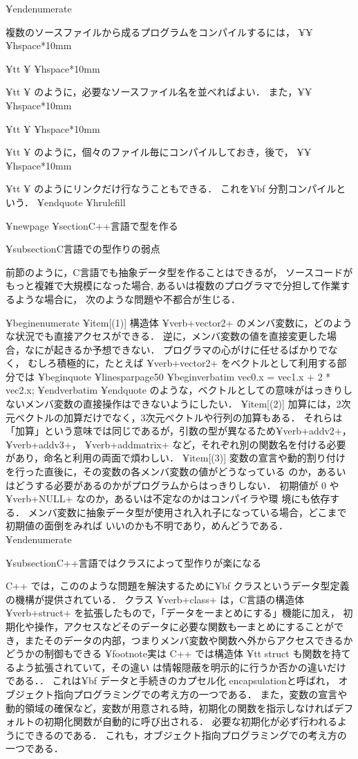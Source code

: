 ¥end{enumerate}

複数のソースファイルから成るプログラムをコンパイルするには，	¥¥
¥hspace*{10mm}{¥tt ¥%
¥hspace*{10mm}{¥tt ¥%
のように，必要なソースファイル名を並べればよい．
また，¥¥
¥hspace*{10mm}{¥tt ¥%
¥hspace*{10mm}{¥tt ¥%
のように，個々のファイル毎にコンパイルしておき，後で，	¥¥
¥hspace*{10mm}{¥tt ¥%
のようにリンクだけ行なうこともできる．
これを{¥bf 分割コンパイル}という．
¥end{quote}
¥hrulefill

¥newpage
¥section{C++言語で型を作る}

¥subsection{C言語での型作りの弱点}

前節のように，C言語でも抽象データ型を作ることはできるが，
ソースコードがもっと複雑で大規模になった場合,
あるいは複数のプログラマで分担して作業するような場合に，
次のような問題や不都合が生じる．

¥begin{enumerate}
 ¥item[(1)] 
構造体 ¥verb+vector2+ のメンバ変数に，どのような状況でも直接アクセスができる．
逆に，メンバ変数の値を直接変更した場合，なにが起きるか予想できない．
プログラマの心がけに任せるばかりでなく，
むしろ積極的に，たとえば ¥verb+vector2+ をベクトルとして利用する部分では
¥begin{quote}
¥linesparpage{50}
¥begin{verbatim}
vec0.x = vec1.x + 2 * vec2.x;
¥end{verbatim}
¥end{quote}
のような，ベクトルとしての意味がはっきりしないメンバ変数の直接操作はできないようにしたい．
 ¥item[(2)] 
加算には，2次元ベクトルの加算だけでなく，3次元ベクトルや行列の加算もある．
それらは「加算」という意味では同じであるが，引数の型が異なるため¥verb+addv2+，¥verb+addv3+，
¥verb+addmatrix+ など，それぞれ別の関数名を付ける必要があり，命名と利用の両面で煩わしい．
¥item[(3)] 
変数の宣言や動的割り付けを行った直後に，その変数の各メンバ変数の値がどうなっている
のか，あるいはどうする必要があるのかがプログラムからはっきりしない．
初期値が 0 や ¥verb+NULL+ なのか，あるいは不定なのかはコンパイラや環
境にも依存する．
メンバ変数に抽象データ型が使用され入れ子になっている場合，どこまで初期値の面倒をみれば
いいのかも不明であり，めんどうである．
¥end{enumerate}


¥subsection{C++言語ではクラスによって型作りが楽になる}

C++ では，こののような問題を解決するために{¥bf クラス}というデータ型定義
の機構が提供されている．
クラス ¥verb+class+ は，C言語の構造体 ¥verb+struct+ を拡張したもので，「データを一まとめにする」機能に加え，
初期化や操作，アクセスなどそのデータに必要な関数も一まとめにすることができ，またそのデータの内部，つまりメンバ変数や関数へ外からアクセスできるかどうかの制御もできる
¥footnote{実は C++ では構造体 {¥tt struct} も関数を持てるよう拡張されていて，その違い
は情報隠蔽を明示的に行うか否かの違いだけである．}．
これは{¥bf データと手続きのカプセル化 encapsulation}と呼ばれ，
オブジェクト指向プログラミングでの考え方の一つである．
また，変数の宣言や動的領域の確保など，変数が用意される時，初期化の関数を指示しなければデフォルトの初期化関数が自動的に呼び出される．
必要な初期化が必ず行われるようにできるのである．
これも，オブジェクト指向プログラミングでの考え方の一つである．

}}}}}
